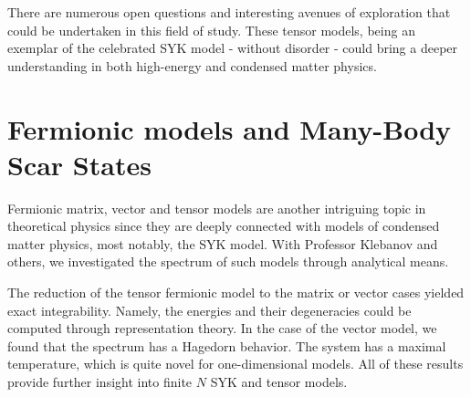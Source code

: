 \documentclass[11pt]{article}
\begin{document}



There are numerous open questions and interesting avenues of exploration that could be undertaken in this field of study. These tensor models, being an exemplar of the celebrated SYK model - without disorder - could bring a deeper understanding in both high-energy and condensed matter physics.

\section*{Fermionic models and Many-Body Scar States}
Fermionic matrix, vector and tensor models are another intriguing topic in theoretical physics since they are deeply connected with models of condensed matter physics, most notably, the SYK model. With Professor Klebanov and others, we investigated the spectrum of such models through analytical means. 

The reduction of the tensor fermionic model to the matrix or vector cases yielded exact integrability. Namely, the energies and their degeneracies could be computed through representation theory. In the case of the vector model, we found that the spectrum has a Hagedorn behavior. The system has a maximal temperature, which is quite novel for one-dimensional models. All of these results provide further insight into finite $N$ SYK and tensor models. 
\end{document}
